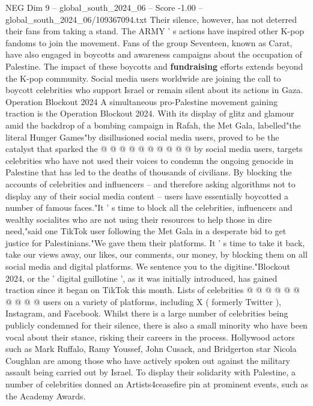 \begin{textsample}{NEG Dim 9 – global\_south\_2024\_06 – Score -1.00 – global\_south\_2024\_06/109367094.txt}
Their silence, however, has not deterred their fans from taking a stand.
The ARMY ' s actions have inspired other K-pop fandoms to join the movement.
Fans of the group Seventeen, known as Carat, have also engaged in boycotts and awareness campaigns about the occupation of Palestine.
The impact of these boycotts and \textbf{fundraising} efforts extends beyond the K-pop community.
Social media users worldwide are joining the call to boycott celebrities who support Israel or remain silent about its actions in Gaza.
Operation Blockout 2024 A simultaneous pro-Palestine movement gaining traction is the Operation Blockout 2024.
With its display of glitz and glamour amid the backdrop of a bombing campaign in Rafah, the Met Gala, labelled"the literal Hunger Games"by disillusioned social media users, proved to be the catalyst that sparked the @ @ @ @ @ @ @ @ @ @ by social media users, targets celebrities who have not used their voices to condemn the ongoing genocide in Palestine that has led to the deaths of thousands of civilians.
By blocking the accounts of celebrities and influencers -- and therefore asking algorithms not to display any of their social media content -- users have essentially boycotted a number of famous faces."It ' s time to block all the celebrities, influencers and wealthy socialites who are not using their resources to help those in dire need,"said one TikTok user following the Met Gala in a desperate bid to get justice for Palestinians."We gave them their platforms.
It ' s time to take it back, take our views away, our likes, our comments, our money, by blocking them on all social media and digital platforms.
We sentence you to the digitine."Blockout 2024, or the ' digital guillotine ', as it was initially introduced, has gained traction since it began on TikTok this month.
Lists of celebrities @ @ @ @ @ @ @ @ @ @ users on a variety of platforms, including X ( formerly Twitter ), Instagram, and Facebook.
Whilst there is a large number of celebrities being publicly condemned for their silence, there is also a small minority who have been vocal about their stance, risking their careers in the process.
Hollywood actors such as Mark Ruffalo, Ramy Youssef, John Cusack, and Bridgerton star Nicola Coughlan are among those who have actively spoken out against the military assault being carried out by Israel.
To display their solidarity with Palestine, a number of celebrities donned an Artists4ceasefire pin at prominent events, such as the Academy Awards.

\end{textsample}
